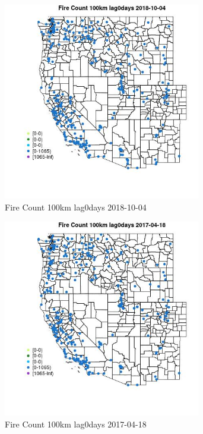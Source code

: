 \begin{figure} 
\centering  
\includegraphics[width=0.77\textwidth]{Code_Outputs/Report_ML_input_PM25_Step4_part_f_de_duplicated_aveswNAs_MapObsFire_Count_100km_lag0days2018-10-04.jpg} 
\caption{\label{fig:Report_ML_input_PM25_Step4_part_f_de_duplicated_aveswNAsMapObsFire_Count_100km_lag0days2018-10-04}Fire Count 100km lag0days 2018-10-04} 
\end{figure} 
 

\begin{figure} 
\centering  
\includegraphics[width=0.77\textwidth]{Code_Outputs/Report_ML_input_PM25_Step4_part_f_de_duplicated_aveswNAs_MapObsFire_Count_100km_lag0days2017-04-18.jpg} 
\caption{\label{fig:Report_ML_input_PM25_Step4_part_f_de_duplicated_aveswNAsMapObsFire_Count_100km_lag0days2017-04-18}Fire Count 100km lag0days 2017-04-18} 
\end{figure} 
 

